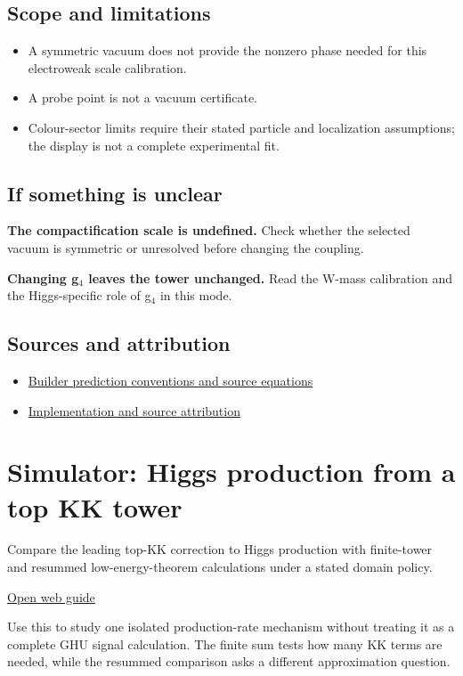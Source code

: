 \documentclass[11pt,a4paper]{article}
\begin{document}
\subsection*{Scope and limitations}
\begin{itemize}
\item A symmetric vacuum does not provide the nonzero phase needed for this electroweak scale calibration.
\item A probe point is not a vacuum certificate.
\item Colour-sector limits require their stated particle and localization assumptions; the display is not a complete experimental fit.
\end{itemize}
\subsection*{If something is unclear}
\textbf{The compactification scale is undefined.} Check whether the selected vacuum is symmetric or unresolved before changing the coupling.

\textbf{Changing g\ensuremath{{}_{4}} leaves the tower unchanged.} Read the W-mass calibration and the Higgs-specific role of g\ensuremath{{}_{4}} in this mode.

\subsection*{Sources and attribution}
\begin{itemize}
\item \href{https://github.com/karlesmarin/ghu-lab/blob/main/src/sections/predict_section.js}{Builder prediction conventions and source equations}
\item \href{https://github.com/karlesmarin/ghu-lab/blob/main/src/modules/predict.mjs}{Implementation and source attribution}
\end{itemize}
\section{Simulator: Higgs production from a top KK tower}
Compare the leading top-KK correction to Higgs production with finite-tower and resummed low-energy-theorem calculations under a stated domain policy.

\href{https://karlesmarin.github.io/ghu-explorer/guide/simulator-higgsrate/index.html}{Open web guide}

Use this to study one isolated production-rate mechanism without treating it as a complete GHU signal calculation. The finite sum tests how many KK terms are needed, while the resummed comparison asks a different approximation question.
\end{document}
